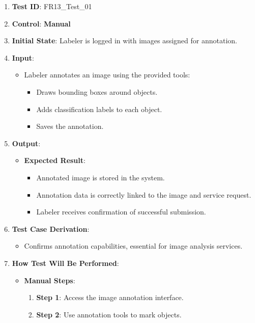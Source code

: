 \documentclass[12pt, titlepage]{article}
\begin{document}
\begin{enumerate}
    \item \textbf{Test ID}: FR13\_Test\_01
    \item \textbf{Control}: \textbf{Manual}
    \item \textbf{Initial State}: Labeler is logged in with images assigned for annotation.
    \item \textbf{Input}:
    \begin{itemize}
        \item Labeler annotates an image using the provided tools:
        \begin{itemize}
            \item Draws bounding boxes around objects.
            \item Adds classification labels to each object.
            \item Saves the annotation.
        \end{itemize}
    \end{itemize}
    \item \textbf{Output}:
    \begin{itemize}
        \item \textbf{Expected Result}:
        \begin{itemize}
            \item Annotated image is stored in the system.
            \item Annotation data is correctly linked to the image and service request.
            \item Labeler receives confirmation of successful submission.
        \end{itemize}
    \end{itemize}
    \item \textbf{Test Case Derivation}:
    \begin{itemize}
        \item Confirms annotation capabilities, essential for image analysis services.
    \end{itemize}
    \item \textbf{How Test Will Be Performed}:
    \begin{itemize}
        \item \textbf{Manual Steps}:
        \begin{enumerate}
            \item \textbf{Step 1}: Access the image annotation interface.
            \item \textbf{Step 2}: Use annotation tools to mark objects.

\end{enumerate}
\end{itemize}
\end{enumerate}
\end{document}
